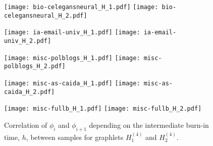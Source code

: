 \begin{figure}[th!]
\begin{center}

\minipage{\myplotwidth}
  \texttt{[image: bio-celegansneural\_H\_1.pdf]}
\endminipage\hfill
\minipage{\myplotwidth}
  \texttt{[image: bio-celegansneural\_H\_2.pdf]}
\endminipage

\hspace*{\fill}
\vskip 1pt
\hspace*{\fill}

\minipage{\myplotwidth}%
  \texttt{[image: ia-email-univ\_H\_1.pdf]}
\endminipage\hfill
\minipage{\myplotwidth}
  \texttt{[image: ia-email-univ\_H\_2.pdf]}
\endminipage

\hspace*{\fill}
\vskip 1pt
\hspace*{\fill}

\minipage{\myplotwidth}%
  \texttt{[image: misc-polblogs\_H\_1.pdf]}
\endminipage\hfill
\minipage{\myplotwidth}
  \texttt{[image: misc-polblogs\_H\_2.pdf]}
\endminipage

\hspace*{\fill}
\vskip 1pt
\hspace*{\fill}

\minipage{\myplotwidth}%
  \texttt{[image: misc-as-caida\_H\_1.pdf]}
\endminipage\hfill
\minipage{\myplotwidth}
  \texttt{[image: misc-as-caida\_H\_2.pdf]}
\endminipage

\hspace*{\fill}
\vskip 1pt
\hspace*{\fill}

\minipage{\myplotwidth}%
  \texttt{[image: misc-fullb\_H\_1.pdf]}
\endminipage\hfill
\minipage{\myplotwidth}
  \texttt{[image: misc-fullb\_H\_2.pdf]}
\endminipage

\hspace*{\fill}
\end{center}
\caption{Correlation of $\phi_i$ and $\phi_{i+1}$ depending on the intermediate burn-in time, $h$, between samples for graphlets $H_1^{(4)}$ and $H_2^{(4)}$.}
\label{fig:correlation}
\end{figure}


